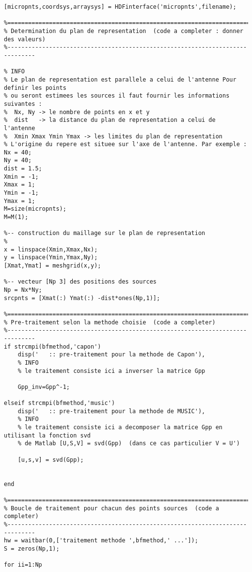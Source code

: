 \begin{verbatim}
[micropnts,coordsys,arraysys] = HDFinterface('micropnts',filename);

%==============================================================================
% Determination du plan de representation  (code a completer : donner des valeurs) 
%------------------------------------------------------------------------------

% INFO
% Le plan de representation est parallele a celui de l'antenne Pour definir les points 
% ou seront estimees les sources il faut fournir les informations suivantes :
%  Nx, Ny -> le nombre de points en x et y
%  dist   -> la distance du plan de representation a celui de l'antenne
%  Xmin Xmax Ymin Ymax -> les limites du plan de representation 
% L'origine du repere est situee sur l'axe de l'antenne. Par exemple :
Nx = 40;
Ny = 40;
dist = 1.5;
Xmin = -1;
Xmax = 1;
Ymin = -1;
Ymax = 1;
M=size(micropnts);
M=M(1);

%-- construction du maillage sur le plan de representation
%
x = linspace(Xmin,Xmax,Nx);
y = linspace(Ymin,Ymax,Ny);
[Xmat,Ymat] = meshgrid(x,y);

%-- vecteur [Np 3] des positions des sources
Np = Nx*Ny;
srcpnts = [Xmat(:) Ymat(:) -dist*ones(Np,1)];

%==============================================================================
% Pre-traitement selon la methode choisie  (code a completer) 
%------------------------------------------------------------------------------
if strcmpi(bfmethod,'capon')
    disp('   :: pre-traitement pour la methode de Capon'),
    % INFO
    % le traitement consiste ici a inverser la matrice Gpp
    
    Gpp_inv=Gpp^-1;

elseif strcmpi(bfmethod,'music')
    disp('   :: pre-traitement pour la methode de MUSIC'),
    % INFO
    % le traitement consiste ici a decomposer la matrice Gpp en utilisant la fonction svd
    % de Matlab [U,S,V] = svd(Gpp)  (dans ce cas particulier V = U')

    [u,s,v] = svd(Gpp);


end    
    
%==============================================================================
% Boucle de traitement pour chacun des points sources  (code a completer) 
%------------------------------------------------------------------------------
hw = waitbar(0,['traitement methode ',bfmethod,' ...']);
S = zeros(Np,1);

for ii=1:Np
    

\end{verbatim}
